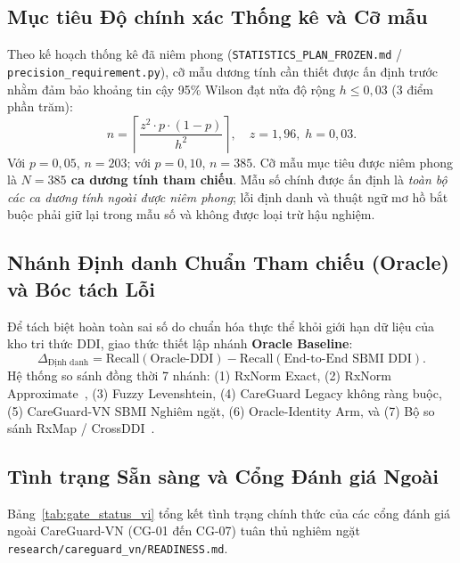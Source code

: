 \documentclass[11pt]{article}
\begin{document}
\subsection{Mục tiêu Độ chính xác Thống kê và Cỡ mẫu}
Theo kế hoạch thống kê đã niêm phong (\texttt{STATISTICS\_PLAN\_FROZEN.md} / \texttt{precision\_requirement.py}), cỡ mẫu dương tính cần thiết được ấn định trước nhằm đảm bảo khoảng tin cậy 95\% Wilson đạt nửa độ rộng $h \le 0{,}03$ (3 điểm phần trăm):
\begin{equation}
n = \left\lceil \frac{z^2 \cdot p \cdot (1-p)}{h^2} \right\rceil, \quad z = 1{,}96, \; h = 0{,}03.
\end{equation}
Với $p = 0{,}05$, $n = 203$; với $p = 0{,}10$, $n = 385$. Cỡ mẫu mục tiêu được niêm phong là \textbf{$N = 385$ ca dương tính tham chiếu}. Mẫu số chính được ấn định là \emph{toàn bộ các ca dương tính ngoài được niêm phong}; lỗi định danh và thuật ngữ mơ hồ bắt buộc phải giữ lại trong mẫu số và không được loại trừ hậu nghiệm.

\subsection{Nhánh Định danh Chuẩn Tham chiếu (Oracle) và Bóc tách Lỗi}
Để tách biệt hoàn toàn sai số do chuẩn hóa thực thể khỏi giới hạn dữ liệu của kho tri thức DDI, giao thức thiết lập nhánh \textbf{Oracle Baseline}:
\begin{equation}
\Delta_{\text{Định danh}} = \mathrm{Recall}(\text{Oracle-DDI}) - \mathrm{Recall}(\text{End-to-End SBMI DDI}).
\end{equation}
Hệ thống so sánh đồng thời 7 nhánh: (1) RxNorm Exact, (2) RxNorm Approximate~\cite{peters2011approx}, (3) Fuzzy Levenshtein, (4) CareGuard Legacy không ràng buộc, (5) CareGuard-VN SBMI Nghiêm ngặt, (6) Oracle-Identity Arm, và (7) Bộ so sánh RxMap / CrossDDI~\cite{korpela2026rxmap,crossddi2026}.

\subsection{Tình trạng Sẵn sàng và Cổng Đánh giá Ngoài}
Bảng~\ref{tab:gate_status_vi} tổng kết tình trạng chính thức của các cổng đánh giá ngoài CareGuard-VN (CG-01 đến CG-07) tuân thủ nghiêm ngặt \texttt{research/careguard\_vn/READINESS.md}.
\end{document}
